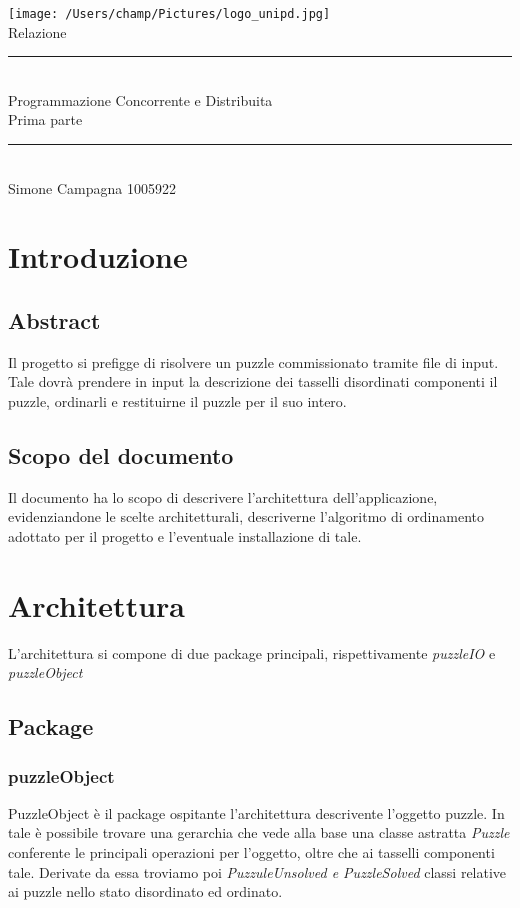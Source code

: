 \documentclass[11pt]{article}
\begin{document}
	\begingroup
    \centering
    \texttt{[image: /Users/champ/Pictures/logo\_unipd.jpg]}\\
    \vspace{3cm}
    {\Huge Relazione}\\
    \rule{12cm}{0.4pt}\\
    \vspace{1cm}
    {\Large Programmazione Concorrente e Distribuita}\\
    \vspace{0.3cm} 
    {Prima parte}
    \rule{12cm}{0.4pt}\\
    \vspace{1cm}
    {\Large Simone Campagna 1005922}\\

    \endgroup
    \setcounter{page}{0}
    \thispagestyle{empty}
    \clearpage
    \setcounter{page}{1}
   


\section{Introduzione}
\subsection{Abstract}
Il progetto si prefigge di risolvere un puzzle commissionato tramite file di input. Tale dovrà prendere in input la descrizione dei tasselli disordinati componenti il puzzle, ordinarli e restituirne il puzzle per il suo intero.
\subsection{Scopo del documento}
Il documento ha lo scopo di descrivere l'architettura dell'applicazione, evidenziandone le scelte architetturali, descriverne l'algoritmo di ordinamento adottato per il progetto e l'eventuale installazione di tale.
\section{Architettura}
L'architettura si compone di due package principali, rispettivamente \textit{puzzleIO} e \textit{puzzleObject}
\subsection{Package}
\subsubsection{puzzleObject}
PuzzleObject è il package ospitante l'architettura descrivente l'oggetto puzzle. In tale è  possibile trovare una gerarchia che vede alla base una classe astratta \textit{Puzzle} conferente le principali operazioni per l'oggetto, oltre che ai tasselli componenti tale. Derivate da essa troviamo poi \textit{PuzzuleUnsolved \emph{e} PuzzleSolved} classi relative ai puzzle nello stato disordinato ed ordinato. 
\end{document}
